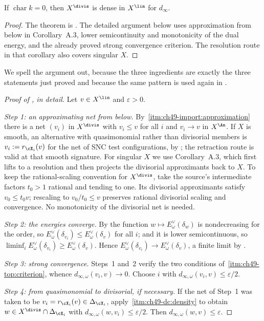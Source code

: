 \begin{theorem}\label{thm:bj-strong-divisorial-density}
If $\operatorname{char}k=0$, then $X^{\divis}$ is dense in
$X^{\lin}$ for $d_\infty$.
\end{theorem}

\begin{proof}
The theorem is \cite[Theorem~11.18]{BJ22}.  The detailed argument
below uses approximation from below in Corollary~A.3, lower
semicontinuity and monotonicity of the dual energy, and the already
proved strong convergence criterion.  The resolution route in that
corollary also covers singular $X$.
\end{proof}

We spell the argument out, because the three ingredients are exactly the
three statements just proved and because the same pattern is used again in
.

\begin{proof}[Proof of , in detail]
Let $v\in X^{\lin}$ and $\varepsilon>0$.

\emph{Step 1: an approximating net from below.}  By
\,\cref{itm:ch49-import:approximation} there is a
net $(v_i)$ in $X^{\divis}$ with $v_i\le v$ for all $i$ and
$v_i\to v$ in $X^{\An}$.  If $X$ is smooth, an alternative with quasimonomial rather than
divisorial members is $v_i:=r_{\cX_i}(v)$ for the net of
SNC test configurations, by
; the retraction route is valid at that smooth signature.
For singular $X$ we use Corollary~A.3, which first lifts to a resolution
and then projects the divisorial approximants back to $X$.
To keep the rational-scaling convention for $X^{\divis}$, take the
source's intermediate factors $t_0>1$ rational and tending to one.
Its divisorial approximants satisfy $v_0\le t_0v$; rescaling to
$v_0/t_0\le v$ preserves rational divisorial scaling and convergence.
No monotonicity of the divisorial net is needed.

\emph{Step 2: the energies converge.}  By
 the function $w\mapsto E^\vee_\omega(\delta_w)$
is nondecreasing for the order, so
$E^\vee_\omega(\delta_{v_i})\le E^\vee_\omega(\delta_v)$ for all $i$;
and it is lower semicontinuous, so
$\liminf_iE^\vee_\omega(\delta_{v_i})\ge E^\vee_\omega(\delta_v)$.  Hence
$E^\vee_\omega(\delta_{v_i})\to E^\vee_\omega(\delta_v)$, a finite limit
by .

\emph{Step 3: strong convergence.}  Steps~1 and~2 verify the two
conditions of
\,\cref{itm:ch49-top:criterion},
whence $d_{\infty,\omega}(v_i,v)\to0$.  Choose $i$ with
$d_{\infty,\omega}(v_i,v)\le\varepsilon/2$.

\emph{Step 4: from quasimonomial to divisorial, if necessary.}  If the net
of Step~1 was taken to be $v_i=r_{\cX_i}(v)\in\Delta_{\cX_i}$, apply
\,\cref{itm:ch49-dc:density} to obtain
$w\in X^{\divis}\cap\Delta_{\cX_i}$ with
$d_{\infty,\omega}(w,v_i)\le\varepsilon/2$.  Then
$d_{\infty,\omega}(w,v)\le\varepsilon$.
\end{proof}

